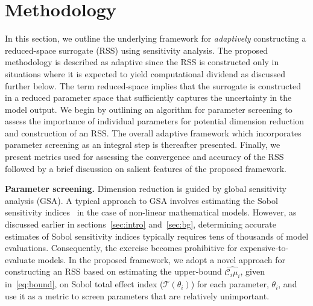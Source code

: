 \section{Methodology}
\label{sec:method}

%

In this section, we outline the underlying framework for \emph{adaptively}
constructing a reduced-space surrogate (RSS) using sensitivity analysis.  The
proposed methodology is described as adaptive since the RSS is constructed only
in situations where it is expected to yield computational dividend as discussed
further below.  The term reduced-space implies that the surrogate is
constructed in a reduced parameter space that sufficiently captures the uncertainty in the
model output. We begin by outlining an algorithm for parameter screening
to assess the importance of individual parameters for potential dimension
reduction and construction of an RSS. The overall adaptive framework 
which incorporates parameter screening as an integral step is thereafter
presented. Finally, we present metrics used for assessing the
convergence and accuracy of the RSS followed by a brief discussion on
salient features of the proposed framework. 

\textbf{Parameter screening.}
Dimension reduction is guided by global sensitivity analysis (GSA).  A typical
approach to GSA involves estimating the Sobol sensitivity
indices~\cite{Sobol:2001} in the case of non-linear mathematical models.
However, as discussed earlier in sections~\ref{sec:intro} and~\ref{sec:bg},
determining accurate estimates of Sobol sensitivity indices typically requires
tens of thousands of model evaluations. Consequently, the exercise becomes
prohibitive for expensive-to-evaluate models.  In the proposed framework, we
adopt a novel approach for constructing an RSS based on estimating the
upper-bound $\widehat{\mathcal{C}_i\mu_i}$, given in~\eqref{eq:bound}, on 
Sobol total effect index ($\mathcal{T}(\theta_i)$) for each 
parameter, $\theta_i$, and use it as a metric to screen 
parameters that are relatively unimportant. 

